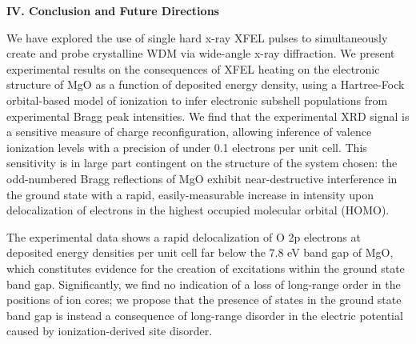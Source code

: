 \textbf{IV. Conclusion and Future Directions}

We have explored the use of single hard x-ray XFEL pulses to
simultaneously create and probe crystalline WDM via wide-angle x-ray
diffraction. We present experimental results on the consequences of XFEL
heating on the electronic structure of MgO as a function of deposited
energy density, using a Hartree-Fock orbital-based model of ionization
to infer electronic subshell populations from experimental Bragg peak
intensities. We find that the experimental XRD signal is a sensitive
measure of charge reconfiguration, allowing inference of valence
ionization levels with a precision of under 0.1 electrons per unit cell.
This sensitivity is in large part contingent on the structure of the
system chosen: the odd-numbered Bragg reflections of MgO exhibit
near-destructive interference in the ground state with a rapid,
easily-measurable increase in intensity upon delocalization of electrons
in the highest occupied molecular orbital (HOMO).

The experimental data shows a rapid delocalization of O 2p electrons at
deposited energy densities per unit cell far below the 7.8 eV band gap
of MgO, which constitutes evidence for the creation of excitations
within the ground state band gap. Significantly, we find no indication
of a loss of long-range order in the positions of ion cores; we propose
that the presence of states in the ground state band gap is instead a
consequence of long-range disorder in the electric potential caused by
ionization-derived site disorder.

